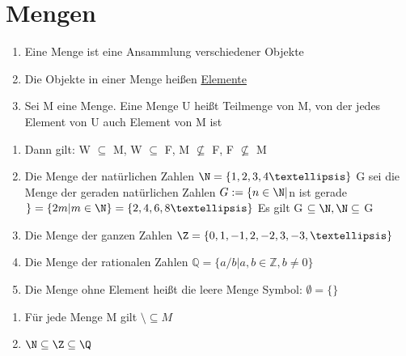 \chapter{Mengen}
\begin{enumerate}
\item Eine Menge ist eine Ansammlung verschiedener Objekte
\item Die Objekte in einer Menge heißen \underline{Elemente}\\
%
%
\item Sei M eine Menge. Eine Menge U heißt Teilmenge von M, von der jedes Element von U auch Element von M ist\\
%
\end{enumerate}
%
\begin{enumerate}
\item {
Dann gilt: W $\subseteq$ M, W $\subseteq$ F, M ${\not\subseteq}$ F, F ${\not\subseteq}$ M}
\item {Die Menge der natürlichen Zahlen
$\N = \{1,2,3,4 …\}$
G sei die Menge der geraden natürlichen Zahlen
$G := \{n \in \N | $n ist gerade$\} = \{2m | m \in \N\} = \{2,4,6,8 …\}$
Es gilt G $\subseteq \N, \N \subseteq$ G}
\item {Die Menge der ganzen Zahlen
$\Z = \{0,1,-1,2,-2,3,-3, …\}$}
\item {Die Menge der rationalen Zahlen
$\mathds{Q} = \{a/b | a, b \in \mathds{Z}, b \neq 0\}$}
\item {Die Menge ohne Element heißt die leere Menge
Symbol: $\emptyset = \{\}$}
\end{enumerate}
%
\bem
\begin{enumerate}
\item Für jede Menge M gilt $\setminus \subseteq M$
\item $\N \subseteq \Z \subseteq \Q$
\end{enumerate}

